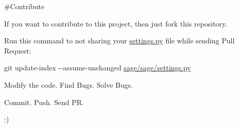 \#\+Contribute

If you want to contribute to this project, then just fork this repository.


\begin{DoxyItemize}
\item Run this command to not sharing your \hyperlink{settings_8py}{settings.\+py} file while sending Pull Request\+:
\end{DoxyItemize}

{\ttfamily git update-\/index -\/-\/assume-\/unchanged \hyperlink{settings_8py}{sage/sage/settings.\+py}}


\begin{DoxyItemize}
\item Modify the code. Find Bugs. Solve Bugs.
\item Commit. Push. Send P\+R.
\end{DoxyItemize}

\+:) 